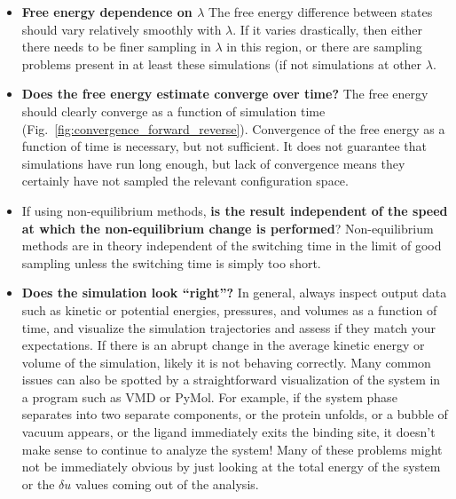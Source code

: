 \begin{itemize}
\item \textbf{Free energy dependence on $\lambda$} The free energy difference between states should vary relatively smoothly with $\lambda$. If it varies drastically, then either there needs to be finer sampling in $\lambda$ in this region, or there are sampling problems present in at least these simulations (if not simulations at other $\lambda$.
\item \textbf{Does the free energy estimate converge over time?} The free energy should clearly converge as a function of simulation time (Fig.~\ref{fig:convergence_forward_reverse}). Convergence of the free energy as a function of time is necessary, but not sufficient.  It does not guarantee that simulations have run long enough, but lack of convergence means they certainly have not sampled the relevant configuration space.
\item If using non-equilibrium methods, \textbf{is the result independent of the speed at which the non-equilibrium change is performed}? Non-equilibrium methods are in theory independent of the switching time in the limit of good sampling unless the switching time is simply too short. 
\item \textbf{Does the simulation look ``right''?} In general, always inspect output data such as kinetic or potential energies, pressures, and volumes as a function of time, and visualize the simulation trajectories and assess if they match your expectations.  If there is an abrupt change in the average kinetic energy or volume of the simulation, likely it is not behaving correctly.  Many common issues can also be spotted by a straightforward visualization of the system in a program such as VMD or PyMol. For example, if the system phase separates into two separate components, or the protein unfolds, or a bubble of vacuum appears, or the ligand immediately exits the binding site, it doesn't make sense to continue to analyze the system! Many of these problems might not be immediately obvious by just looking at the total energy of the system or the $\delta u$ values coming out of the analysis.
\end{itemize}
